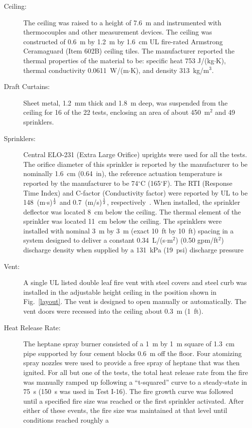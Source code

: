 \begin{description}
\item[Ceiling:] The ceiling was raised to a height of 7.6~m and instrumented with thermocouples and other measurement devices. The ceiling was constructed of
0.6~m by 1.2~m by 1.6~cm UL fire-rated Armstrong Ceramaguard (Item 602B) ceiling tiles. The manufacturer reported the
thermal properties of the material to be: specific heat 753 J/(kg$\cdot$K), thermal conductivity
0.0611~W/(m$\cdot$K), and density 313~kg/m$^3$.
\item[Draft Curtains:] Sheet metal, 1.2~mm thick and 1.8~m deep, was suspended from the ceiling for 16 of the 22 tests, enclosing an area of about 450~m$^2$ and 49 sprinklers.
\item[Sprinklers:] Central ELO-231 (Extra Large Orifice) uprights were used for all the tests. The orifice diameter of this sprinkler is reported by the manufacturer to be
nominally 1.6~cm (0.64~in), the reference actuation temperature is reported by the manufacturer to be 74$^\circ$C (165$^\circ$F). The RTI (Response Time
Index) and C-factor (Conductivity factor) were reported by UL to be 148~(m$\cdot$s)$^{\frac{1}{2}}$ and 0.7~(m/s)$^{\frac{1}{2}}$, respectively~\cite{Sheppard:1}.
When installed, the sprinkler deflector was located 8~cm below the ceiling. The thermal
element of the sprinkler was located 11~cm below the ceiling. The sprinklers were installed with nominal 3~m by 3~m (exact 10~ft by 10~ft) spacing in a
system designed to deliver a constant 0.34~L/(s$\cdot$m$^2$) (0.50 gpm/ft$^2$) discharge density when supplied by a 131~kPa (19~psi) discharge
pressure
\item[Vent:] A single UL listed double leaf fire vent with steel covers and steel curb was installed in the adjustable height ceiling in the position shown in
Fig.~\ref{layout}. The vent is designed to open manually or automatically. The vent doors were recessed into the ceiling about 0.3~m (1~ft).
\item[Heat Release Rate:] The heptane spray burner consisted of a 1~m by 1~m square of 1.3~cm pipe supported by four cement blocks 0.6~m off the floor.
Four atomizing spray nozzles were used to provide a free spray of heptane that was then ignited. For all but one of the tests, the total heat release
rate from the fire was manually ramped up following a ``t-squared'' curve to a steady-state in 75~s
(150~s was used in Test I-16). The fire growth curve was followed until a specified fire size was
reached or the first sprinkler activated. After either of these events, the fire size was maintained at that level until conditions reached roughly a

\end{description}
